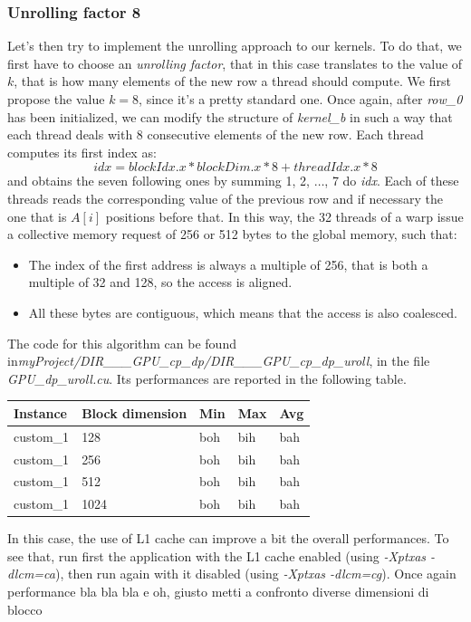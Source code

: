 \documentclass[12pt]{extarticle}
\begin{document}
\subsubsection{Unrolling factor 8}
Let's then try to implement the unrolling approach to our kernels. To do that, we first have to choose an \emph{unrolling factor}, that in this case translates to the value of $k$, that is how many elements of the new row a thread should compute. We first propose the value $k = 8$, since it's a pretty standard one.\newline
Once again, after \emph{row\_0} has been initialized, we can modify the structure of \emph{kernel\_b} in such a way that each thread deals with 8 consecutive elements of the new row.\newline
Each thread computes its first index as:
\[idx = blockIdx.x * blockDim.x * 8 + threadIdx.x * 8 \]
and obtains the seven following ones by summing 1, 2, $\dots$, 7 do \emph{idx}. Each of these threads reads the corresponding value of the previous row and if necessary the one that is $A[i]$ positions before that. In this way, the 32 threads of a warp issue a collective memory request of 256 or 512 bytes to the global memory, such that:
\begin{itemize}
    \item The index of the first address is always a multiple of 256, that is both a multiple of 32 and 128, so the access is aligned.
    \item All these bytes are contiguous, which means that the access is also coalesced.
\end{itemize}
The code for this algorithm can be found in\newline \emph{myProject/DIR\_\_\_GPU\_cp\_dp/DIR\_\_\_GPU\_cp\_dp\_uroll}, in the file \emph{GPU\_dp\_uroll.cu}.\newline
Its performances are reported in the following table.
\begin{center}
\begin{tabular}{ | m{2.2cm} | m{3.2cm} | m{2.2cm} | m{2.2cm} | m{2.2cm} |}
 \hline
 Instance & Block dimension & Min & Max & Avg\\
 \hline
 custom\_1 & 128 & boh & bih & bah\\
 \hline
 custom\_1 & 256 & boh & bih & bah\\
 \hline
 custom\_1 & 512 & boh & bih & bah\\
 \hline
 custom\_1 & 1024 & boh & bih & bah\\
 \hline
 \end{tabular}
 \end{center}
In this case, the use of L1 cache can improve a bit the overall performances. To see that, run first the application with the L1 cache enabled (using \emph{-Xptxas -dlcm=ca}), then run again with it disabled (using \emph{-Xptxas -dlcm=cg}).\newline
Once again performance bla bla bla e oh, giusto metti a confronto diverse dimensioni di blocco
\end{document}
